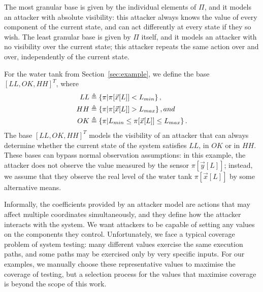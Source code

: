 {\begin{definition}
The most granular base is given by the individual elements of $\Pi$, and it models an attacker with absolute visibility: this attacker always knows the value of every component of the current state, and can act differently at every state if they so wish. The least granular base is given by $\Pi$ itself, and it models an attacker with no visibility over the current state; this attacker repeats the same action over and over, independently of the current state.
\end{definition}
\begin{example}
  \label{ex:AttackBasis}
  For the water tank from Section~\ref{sec:example}, we define the base $[LL, OK, HH]^T$, where 
  \begin{align*}
    {LL}&\triangleq\left\{\pi| \pi[\vec{x}[L]]<L_{min}\right\},\\
    {HH}&\triangleq\left\{\pi| \pi[\vec{x}[L]]>L_{max}\right\}, and\\
    {OK}&\triangleq\left\{\pi|L_{min} \leq \pi[\vec{x}[L]]\leq L_{max}\right\}.
  \end{align*} 
  The base $[LL, OK, HH]^T$ models the visibility of an attacker that can always determine whether the current state of the system satisfies $LL$, in $OK$ or in $HH$. These bases can bypass normal observation assumptions: in this example, the attacker does not observe the value measured by the sensor $\pi[\vec{y}[L]]$; instead, we assume that they observe the real level of the water tank $\pi[\vec{x}[L]]$ by some alternative means. %
\end{example}

Informally, the coefficients provided by an attacker model are actions that may affect multiple coordinates simultaneously, and they define how the attacker interacts with the system. We want attackers to be capable of setting any values on the components they control. Unfortunately, we face a typical coverage problem of system testing: many different values exercise the same execution paths, and some paths may be exercised only by very specific inputs. For our examples, we manually choose these representative values to maximise the coverage of testing, but a selection process for the values that maximise coverage is beyond the scope of this work.

}
